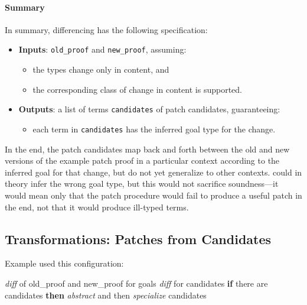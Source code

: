 \paragraph{Summary}
In summary, differencing has the following specification:

\begin{itemize}
\item \textbf{Inputs}: \lstinline{old_proof} and \lstinline{new_proof}, assuming:
\begin{itemize}
\item the types change only in content, and
\item the corresponding class of change in content is supported.
\end{itemize}
\item \textbf{Outputs}: a list of terms \lstinline{candidates} of patch candidates, guaranteeing:
\begin{itemize}
\item each term in \lstinline{candidates} has the inferred goal type for the change.
\end{itemize}
\end{itemize}
In the end, the patch candidates map back and forth between the old and new versions
of the example patch proof in a particular context according to the inferred goal for that change, but do not yet generalize to other contexts.
\sysname could in theory infer the wrong goal type, but this would not sacrifice soundness---it would mean only that
the patch procedure would fail to produce a useful patch in the end, not that it would produce ill-typed terms.

\subsection{Transformations: Patches from Candidates}
\label{sec:pumpkin-spec-trans}



Example used this configuration:

\begin{algorithm}
\footnotesize
\begin{algorithmic}[1]
    \STATE \textit{diff}  of old\_proof and new\_proof for goals
    \STATE \textit{diff}  for candidates
    \STATE \textbf{if} there are candidates \textbf{then}
    \STATE \hspace*{1em} \textit{abstract} and then \textit{specialize} candidates
\end{algorithmic}
\end{algorithm}

